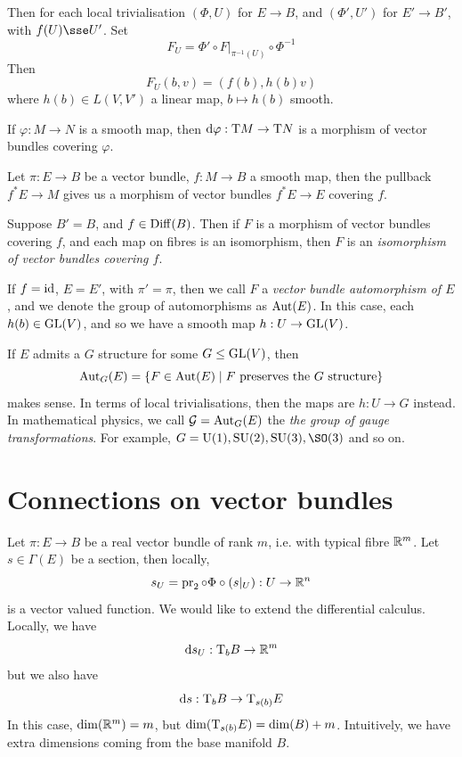 \documentclass{article}
\begin{document}
Then for each local trivialisation \((\Phi, U)\) for \(E \to B\), and \((\Phi', U')\) for \(E' \to B'\), with \(f(U) \sse U'\). Set
\[F_U = \Phi' \circ F\vert_{\pi^{-1}(U)} \circ \Phi^{-1}\]
Then
\[F_U(b, v) = (f(b), h(b)v)\]
where \(h(b) \in L(V, V')\) a linear map, \(b \mapsto h(b)\) smooth.

\begin{example}
    If \(\varphi : M \to N\) is a smooth map, then \(\dd\varphi : \mathrm{T} M \to \mathrm{T} N\) is a morphism of vector bundles covering \(\varphi\).
\end{example}

\begin{example}
    Let \(\pi : E \to B\) be a vector bundle, \(f : M \to B\) a smooth map, then the pullback \(f^*E \to M\) gives us a morphism of vector bundles \(f^*E \to E\) covering \(f\).
\end{example}

\begin{example}
    Suppose \(B' = B\), and \(f \in \operatorname{Diff}(B)\). Then if \(F\) is a morphism of vector bundles covering \(f\), and each map on fibres is an isomorphism, then \(F\) is an \emph{isomorphism of vector bundles covering \(f\)}.

    If \(f = \operatorname{id}\), \(E = E'\), with \(\pi' = \pi\), then we call \(F\) a \emph{vector bundle automorphism of \(E\)}, and we denote the group of automorphisms as \(\operatorname{Aut}(E)\). In this case, each \(h(b) \in \operatorname{GL}(V)\), and so we have a smooth map \(h : U \to \operatorname{GL}(V)\).
\end{example}

\begin{example}
    If \(E\) admits a \(G\) structure for some \(G \le \operatorname{GL}(V)\), then
    \[\operatorname{Aut}_G(E) = \left\{F \in \operatorname{Aut}(E) \mid F \text{ preserves the }G\text{ structure}\right\}\]
    makes sense. In terms of local trivialisations, then the maps are \(h : U \to G\) instead. In mathematical physics, we call \(\mathcal{G} = \operatorname{Aut}_G(E)\) the \emph{the group of gauge transformations}. For example, \(G = \mathrm{U}(1), \mathrm{SU}(2), \mathrm{SU}(3), \SO(3)\) and so on.
\end{example}

\section{Connections on vector bundles}

Let \(\pi : E \to B\) be a real vector bundle of rank \(m\), i.e. with typical fibre \(\mathbb{R}^m\). Let \(s \in \Gamma(E)\) be a section, then locally,
\[s_U = \operatorname{pr}_2 \circ \Phi \circ (s\vert_U) : U \to \mathbb{R}^n\]
is a vector valued function. We would like to extend the differential calculus. Locally, we have
\[\dd s_U : \mathrm{T}_b B \to \mathbb{R}^m\]
but we also have
\[\dd s : \mathrm{T}_b B \to \mathrm{T}_{s(b)}E\]
In this case, \(\dim(\mathbb{R}^m) = m\), but \(\dim(\mathrm{T}_{s(b)}E) = \dim(B) + m\). Intuitively, we have extra dimensions coming from the base manifold \(B\).
\end{document}

